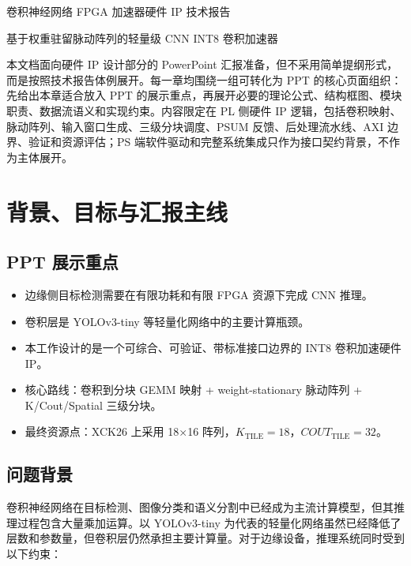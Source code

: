 \documentclass[fontset=fandol,ugly,language=chinese]{pkuthss}
\newcommand{\KTILE}{K_{\mathrm{TILE}}}
\newcommand{\COUTTILE}{COUT_{\mathrm{TILE}}}
\begin{document}
\frontmatter
\pagestyle{plain}

\begin{center}
    {\heiti 卷积神经网络 FPGA 加速器硬件 IP 技术报告}

    \vspace{1em}
    {基于权重驻留脉动阵列的轻量级 CNN INT8 卷积加速器}
\end{center}

\vspace{1em}

本文档面向硬件 IP 设计部分的 PowerPoint 汇报准备，但不采用简单提纲形式，而是按照技术报告体例展开。每一章均围绕一组可转化为 PPT 的核心页面组织：先给出本章适合放入 PPT 的展示重点，再展开必要的理论公式、结构框图、模块职责、数据流语义和实现约束。内容限定在 PL 侧硬件 IP 逻辑，包括卷积映射、脉动阵列、输入窗口生成、三级分块调度、PSUM 反馈、后处理流水线、AXI 边界、验证和资源评估；PS 端软件驱动和完整系统集成只作为接口契约背景，不作为主体展开。

\tableofcontents

\mainmatter

\chapter{背景、目标与汇报主线}

\section{PPT 展示重点}

\begin{itemize}
    \item 边缘侧目标检测需要在有限功耗和有限 FPGA 资源下完成 CNN 推理。
    \item 卷积层是 YOLOv3-tiny 等轻量化网络中的主要计算瓶颈。
    \item 本工作设计的是一个可综合、可验证、带标准接口边界的 INT8 卷积加速硬件 IP。
    \item 核心路线：卷积到分块 GEMM 映射 + weight-stationary 脉动阵列 + K/Cout/Spatial 三级分块。
    \item 最终资源点：XCK26 上采用 18$\times$16 阵列，$\KTILE=18$，$\COUTTILE=32$。
\end{itemize}

\section{问题背景}

卷积神经网络在目标检测、图像分类和语义分割中已经成为主流计算模型，但其推理过程包含大量乘加运算。以 YOLOv3-tiny 为代表的轻量化网络虽然已经降低了层数和参数量，但卷积层仍然承担主要计算量。对于边缘设备，推理系统同时受到以下约束：
\end{document}
